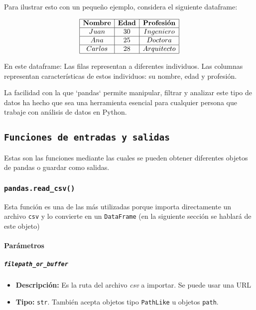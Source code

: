 Para ilustrar esto con un pequeño ejemplo, considera el siguiente dataframe:

\[
    \begin{array}{|c|c|c|}
        \hline
        \textbf{Nombre} & \textbf{Edad} & \textbf{Profesión} \\
        \hline
        Juan            & 30            & Ingeniero          \\
        \hline
        Ana             & 25            & Doctora            \\
        \hline
        Carlos          & 28            & Arquitecto         \\
        \hline
    \end{array}
\]

En este dataframe:
Las filas representan a diferentes individuos.
Las columnas representan características de estos individuos: su nombre, edad y
profesión.

La facilidad con la que `pandas` permite manipular, filtrar y analizar este
tipo de datos ha hecho que sea una herramienta esencial para cualquier persona
que trabaje con análisis de datos en Python.

\subsection{\texttt{Funciones de entradas y salidas}}

Estas son las funciones mediante las cuales se pueden obtener diferentes
objetos de pandas o guardar como salidas.

\subsubsection{\texttt{pandas.read\_csv()}}

Esta función es una de las más utilizadas porque importa directamente un
archivo \texttt{csv} y lo convierte en un \texttt{DataFrame} (en la siguiente
sección se hablará de este objeto)

\paragraph{Parámetros}

\subparagraph{\texttt{filepath\_or\_buffer}}

\begin{itemize}
    \item \textbf{Descripción:} Es la ruta del archivo \textit{csv} a importar.
          Se puede usar una URL
    \item \textbf{Tipo:} \texttt{str}. También acepta objetos tipo
          \texttt{PathLike} u objetos \texttt{path}.
\end{itemize}

